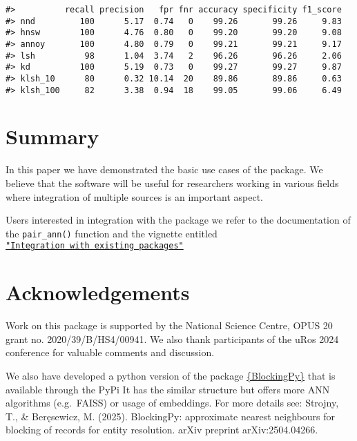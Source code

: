 \begin{verbatim}
#>          recall precision   fpr fnr accuracy specificity f1_score
#> nnd         100      5.17  0.74   0    99.26       99.26     9.83
#> hnsw        100      4.76  0.80   0    99.20       99.20     9.08
#> annoy       100      4.80  0.79   0    99.21       99.21     9.17
#> lsh          98      1.04  3.74   2    96.26       96.26     2.06
#> kd          100      5.19  0.73   0    99.27       99.27     9.87
#> klsh_10      80      0.32 10.14  20    89.86       89.86     0.63
#> klsh_100     82      3.38  0.94  18    99.05       99.06     6.49
\end{verbatim}

\section{Summary}\label{summary}

In this paper we have demonstrated the basic use cases of the
 package. We believe that the software will be useful
for researchers working in various fields where integration of multiple
sources is an important aspect.

Users interested in integration with the  package we refer to
the documentation of the \texttt{pair\_ann()} function and the vignette entitled \href{https://cran.r-project.org/web/packages/blocking/vignettes/v3-integration.html}{\texttt{"Integration\ with\ existing\ packages"}}

\section{Acknowledgements}\label{acknowledgements}

Work on this package is supported by the National Science Centre, OPUS
20 grant no. 2020/39/B/HS4/00941. We also thank participants of the uRos
2024 conference for valuable comments and discussion.

We also have developed a python version of the package \href{https://blockingpy.readthedocs.io/en/latest/}{\{BlockingPy\}} that
is available through the PyPi It has the similar structure but offers
more ANN algorithms (e.g.~FAISS) or usage of embeddings. For more
details see: Strojny, T., \& Beręsewicz, M. (2025). BlockingPy:
approximate nearest neighbours for blocking of records for entity
resolution. arXiv preprint arXiv:2504.04266.



\address{%
Maciej Beręsewicz\\
University of Economics and BusinessStatisical Office in Poznań\\%
Department of Statistics, Poznań, Poland\\ Centre for the Methodology of Population Studies\\
%
\url{https://maciejberesewicz.com}\\%
\textit{ORCiD: \href{https://orcid.org/0000-0002-8281-4301}{0000-0002-8281-4301}}\\%
\href{mailto:maciej.beresewicz@poznan.pl}{\nolinkurl{maciej.beresewicz@poznan.pl}}%
}

\address{%
Adam Struzik\\
Adam Mickiewicz UniversityStatisical Office in Poznań\\%
Department of Mathematics, Poznań, Poland\\ Centre for Urban Statistics\\
%
%
%
\href{mailto:adastr5@st.amu.edu.pl}{\nolinkurl{adastr5@st.amu.edu.pl}}%
}
